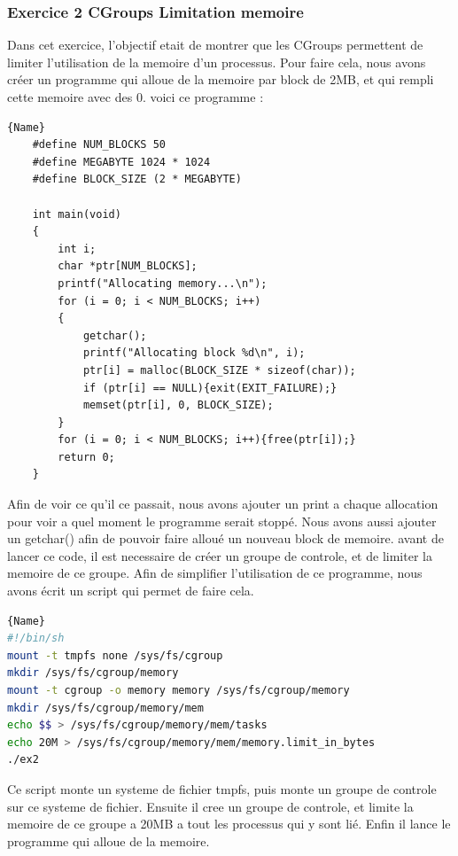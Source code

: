 \documentclass[
	a4paper, %
	10pt, %
]{CSUniSchoolLabReport}
\begin{document}
\subsubsection{Exercice 2 CGroups Limitation memoire}\label{MPEx2}
Dans cet exercice, l'objectif etait de montrer que les CGroups permettent de limiter l'utilisation de la memoire d'un processus.
Pour faire cela, nous avons créer un programme qui alloue de la memoire par block de 2MB, et qui rempli cette memoire avec des 0.
voici ce programme : \\
\begin{lstlisting}[style=CStyle, caption=Allocation de memoire, firstnumber=1]{Name}
	#define NUM_BLOCKS 50
	#define MEGABYTE 1024 * 1024
	#define BLOCK_SIZE (2 * MEGABYTE)
	
	int main(void)
	{
		int i;
		char *ptr[NUM_BLOCKS];
		printf("Allocating memory...\n");
		for (i = 0; i < NUM_BLOCKS; i++)
		{
			getchar();
			printf("Allocating block %d\n", i);
			ptr[i] = malloc(BLOCK_SIZE * sizeof(char));
			if (ptr[i] == NULL){exit(EXIT_FAILURE);}
			memset(ptr[i], 0, BLOCK_SIZE);
		}
		for (i = 0; i < NUM_BLOCKS; i++){free(ptr[i]);}
		return 0;
	}
\end{lstlisting}
Afin de voir ce qu'il ce passait, nous avons ajouter un print a chaque allocation pour voir a quel moment le programme serait stoppé.
Nous avons aussi ajouter un getchar() afin de pouvoir faire alloué un nouveau block de memoire.
\linebreak
avant de lancer ce code, il est necessaire de créer un groupe de controle, et de limiter la memoire de ce groupe. Afin de simplifier l'utilisation de ce programme, nous avons écrit un script qui permet de faire cela.

\begin{lstlisting}[language=bash, firstnumber=1]{Name}
#!/bin/sh
mount -t tmpfs none /sys/fs/cgroup
mkdir /sys/fs/cgroup/memory
mount -t cgroup -o memory memory /sys/fs/cgroup/memory
mkdir /sys/fs/cgroup/memory/mem
echo $$ > /sys/fs/cgroup/memory/mem/tasks
echo 20M > /sys/fs/cgroup/memory/mem/memory.limit_in_bytes
./ex2
\end{lstlisting}
Ce script monte un systeme de fichier tmpfs, puis monte un groupe de controle sur ce systeme de fichier.
Ensuite il cree un groupe de controle, et limite la memoire de ce groupe a 20MB a tout les processus qui y sont lié.
Enfin il lance le programme qui alloue de la memoire.
\end{document}
